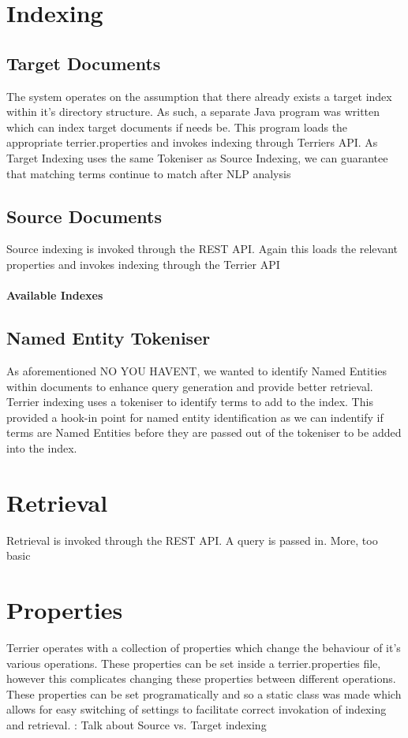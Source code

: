 \documentclass{l4proj}
\begin{document}
\section{Indexing}
\subsection{Target Documents}
The system operates on the assumption that there already exists a target index within it's directory structure.
As such, a separate Java program was written which can index target documents if needs be. This program loads the appropriate terrier.properties and invokes indexing through Terriers API. As Target Indexing uses the same Tokeniser as Source Indexing, we can guarantee that matching terms continue to match after NLP analysis

\subsection{Source Documents}
Source indexing is invoked through the REST API. Again this loads the relevant properties and invokes indexing through the Terrier API

\paragraph{Available Indexes}

\subsection{Named Entity Tokeniser}
As aforementioned NO YOU HAVENT, we wanted to identify Named Entities within documents to enhance query generation and provide better retrieval. Terrier indexing uses a tokeniser to identify terms to add to the index. This provided a hook-in point for named entity identification as we can indentify if terms are Named Entities before they are passed out of the tokeniser to be added into the index.

\section{Retrieval}
Retrieval is invoked through the REST API. A query is passed in. More, too basic

\section{Properties}
Terrier operates with a collection of properties which change the behaviour of it's various operations. These properties can be set inside a terrier.properties file, however this complicates changing these properties between different operations. These properties can be set programatically and so a static class was made which allows for easy switching of settings to facilitate correct invokation of indexing and retrieval. : Talk about Source vs. Target indexing
\end{document}
